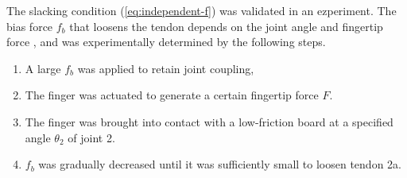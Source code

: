 \documentclass{llncs}
\begin{document}

The slacking condition (\ref{eq:independent-f}) was validated in an ezperiment.
The bias force $f_b$ that loosens the tendon depends on the joint angle and fingertip force
, and was experimentally determined by the following steps.
\begin{enumerate}
	\item A large $f_b$ was applied to retain joint coupling,
	\item The finger was actuated to generate a certain fingertip force $F$.
	\item The finger was brought into contact with a low-friction board at a specified angle $\theta_2$ of joint 2.
	\item $f_b$ was gradually decreased until it was sufficiently small to loosen tendon 2a.
\end{enumerate}
\end{document}
